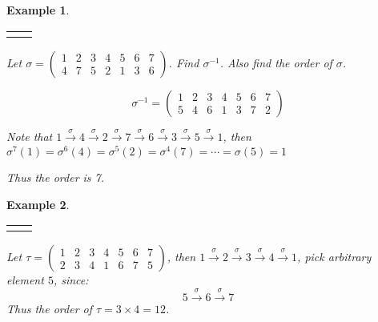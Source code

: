 \documentclass{article}
\theoremstyle{MyNonumberplain}
\theoremstyle{break}
\newcommand{\nline}{\begin{tabular}{ll}&\\\end{tabular}}
\theoremstyle{break}
\newtheorem{example}{Example}[section]
\theoremstyle{break}
\theoremstyle{definition}
\theoremstyle{break}
\begin{document}
\begin{expbox}
    \begin{example}

        \nline

        Let $\sigma = \left(\begin{array}{ccccccc}
            1 & 2 & 3 & 4 & 5 & 6 & 7\\
            4 & 7 & 5 & 2 & 1 & 3 & 6
          \end{array}\right)$. Find $\sigma^{- 1}$. Also find the order of $\sigma$.
            \begin{ansbox}
                $$\sigma^{- 1} = \left(\begin{array}{ccccccc}
                    1 & 2 & 3 & 4 & 5 & 6 & 7\\
                    5 & 4 & 6 & 1 & 3 & 7 & 2
                \end{array}\right)$$\bigskip
                
                Note that $1 \xrightarrow{\sigma} 4 \xrightarrow{\sigma} 2
                \xrightarrow{\sigma} 7 \xrightarrow{\sigma} 6 \xrightarrow{\sigma} 3
                \xrightarrow{\sigma} 5  \xrightarrow{\sigma} 1$, then $\sigma^7 (1) = \sigma^6
                (4) = \sigma^5 (2) = \sigma^4 (7) = \cdots = \sigma (5) = 1$\bigskip
                
                Thus the order is 7.

            \end{ansbox}



    \end{example}
\end{expbox}

\begin{expbox}
    \begin{example}

        \nline

        Let $\tau = \left(\begin{array}{ccccccc}
            1 & 2 & 3 & 4 & 5 & 6 & 7\\
            2 & 3 & 4 & 1 & 6 & 7 & 5
          \end{array}\right)$, then $1 \xrightarrow{\sigma} 2 \xrightarrow{\sigma} 3
          \xrightarrow{\sigma} 4 \xrightarrow{\sigma} 1$, pick arbitrary element $5$,
            since:
          \[ 5 \xrightarrow{\sigma} 6 \xrightarrow{\sigma} 7 \]
          Thus the order of $\tau = 3 \times 4 = 12$. 
    \end{example}
\end{expbox}
\end{document}
